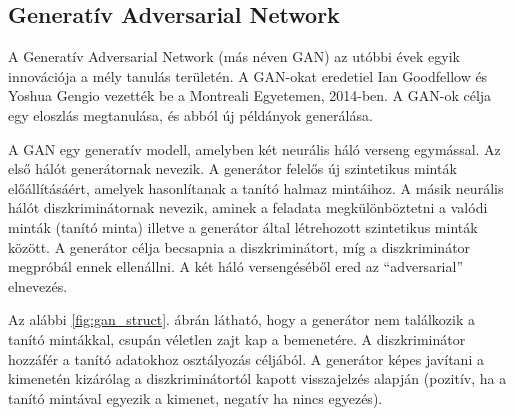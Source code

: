 \subsection{Generatív Adversarial Network}

A Generatív Adversarial Network (más néven GAN) az utóbbi évek egyik innovációja a mély tanulás területén. A GAN-okat eredetiel Ian Goodfellow és Yoshua Gengio vezették be a Montreali Egyetemen, 2014-ben. A GAN-ok célja egy eloszlás megtanulása, és abból új példányok generálása.

A GAN egy generatív modell, amelyben két neurális háló verseng egymással. Az első hálót generátornak nevezik. A generátor felelős új szintetikus minták előállításáért, amelyek hasonlítanak a tanító halmaz mintáihoz. A másik neurális hálót diszkriminátornak nevezik, aminek a feladata megkülönböztetni a valódi minták (tanító minta) illetve a generátor által létrehozott szintetikus minták között. A generátor célja becsapnia a diszkriminátort, míg a diszkriminátor megpróbál ennek ellenállni. A két háló versengéséből ered az ``adversarial'' elnevezés.

Az alábbi \ref{fig:gan_struct}. ábrán látható, hogy a generátor nem találkozik a tanító mintákkal, csupán véletlen zajt kap a bemenetére. A diszkriminátor hozzáfér a tanító adatokhoz osztályozás céljából. A generátor képes javítani a kimenetén kizárólag a diszkriminátortól kapott visszajelzés alapján (pozitív, ha a tanító mintával egyezik a kimenet, negatív ha nincs egyezés).




